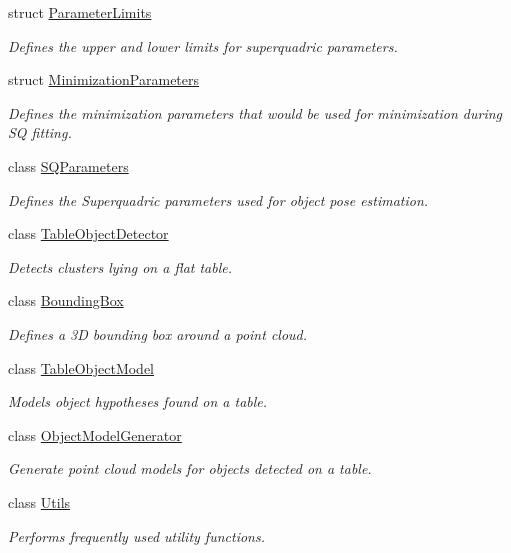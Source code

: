 \begin{DoxyCompactItemize}
struct \hyperlink{structope_1_1_parameter_limits}{Parameter\-Limits}
\begin{DoxyCompactList}\small\item\em Defines the upper and lower limits for superquadric parameters. \end{DoxyCompactList}\item 
struct \hyperlink{structope_1_1_minimization_parameters}{Minimization\-Parameters}
\begin{DoxyCompactList}\small\item\em Defines the minimization parameters that would be used for minimization during S\-Q fitting. \end{DoxyCompactList}\item 
class \hyperlink{classope_1_1_s_q_parameters}{S\-Q\-Parameters}
\begin{DoxyCompactList}\small\item\em Defines the Superquadric parameters used for object pose estimation. \end{DoxyCompactList}\item 
class \hyperlink{classope_1_1_table_object_detector}{Table\-Object\-Detector}
\begin{DoxyCompactList}\small\item\em Detects clusters lying on a flat table. \end{DoxyCompactList}\item 
class \hyperlink{classope_1_1_bounding_box}{Bounding\-Box}
\begin{DoxyCompactList}\small\item\em Defines a 3\-D bounding box around a point cloud. \end{DoxyCompactList}\item 
class \hyperlink{classope_1_1_table_object_model}{Table\-Object\-Model}
\begin{DoxyCompactList}\small\item\em Models object hypotheses found on a table. \end{DoxyCompactList}\item 
class \hyperlink{classope_1_1_object_model_generator}{Object\-Model\-Generator}
\begin{DoxyCompactList}\small\item\em Generate point cloud models for objects detected on a table. \end{DoxyCompactList}\item 
class \hyperlink{classope_1_1_utils}{Utils}
\begin{DoxyCompactList}\small\item\em Performs frequently used utility functions. \end{DoxyCompactList}\end{DoxyCompactItemize}
